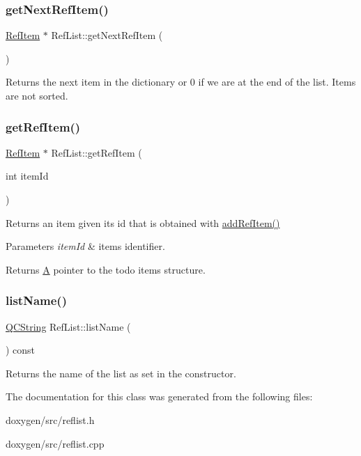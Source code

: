 \subsubsection{\texorpdfstring{getNextRefItem()}{getNextRefItem()}}
{\footnotesize\ttfamily \mbox{\hyperlink{struct_ref_item}{Ref\+Item}} $\ast$ Ref\+List\+::get\+Next\+Ref\+Item (\begin{DoxyParamCaption}{ }\end{DoxyParamCaption})}

Returns the next item in the dictionary or 0 if we are at the end of the list. Items are not sorted. \mbox{\label{class_ref_list_af047154431d78b27f413e14cadc1d15e}} 
\subsubsection{\texorpdfstring{getRefItem()}{getRefItem()}}
{\footnotesize\ttfamily \mbox{\hyperlink{struct_ref_item}{Ref\+Item}} $\ast$ Ref\+List\+::get\+Ref\+Item (\begin{DoxyParamCaption}\item[{int}]{item\+Id }\end{DoxyParamCaption})}

Returns an item given it\textquotesingle{}s id that is obtained with \mbox{\hyperlink{class_ref_list_ae3dccd8cef3a09ed34c6fb611766875b}{add\+Ref\+Item()}} 
\begin{DoxyParams}{Parameters}
{\em item\+Id} & item\textquotesingle{}s identifier. \\
\hline
\end{DoxyParams}
\begin{DoxyReturn}{Returns}
\mbox{\hyperlink{class_a}{A}} pointer to the todo item\textquotesingle{}s structure. 
\end{DoxyReturn}
\mbox{\label{class_ref_list_a7e731cccf3c01e3b8c04c1955e8e0a5e}} 
\subsubsection{\texorpdfstring{listName()}{listName()}}
{\footnotesize\ttfamily \mbox{\hyperlink{class_q_c_string}{Q\+C\+String}} Ref\+List\+::list\+Name (\begin{DoxyParamCaption}{ }\end{DoxyParamCaption}) const}

Returns the name of the list as set in the constructor. 

The documentation for this class was generated from the following files\+:\begin{DoxyCompactItemize}
\item 
doxygen/src/reflist.\+h\item 
doxygen/src/reflist.\+cpp\end{DoxyCompactItemize}
